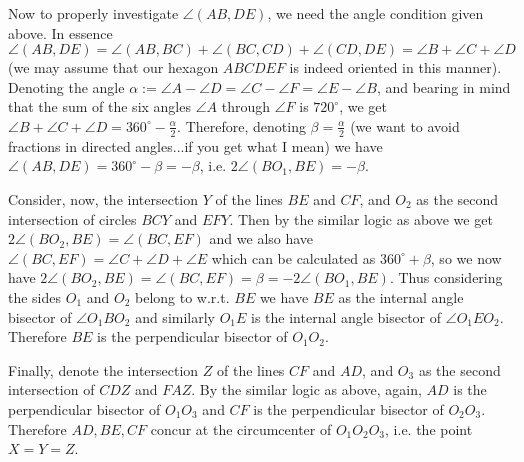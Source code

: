 \documentclass[11pt,a4paper]{article}
\begin{document}
\begin{enumerate}
	Now to properly investigate $\angle(AB, DE)$, we need the angle condition given above. In essence $\angle(AB, DE)=\angle(AB, BC)+\angle(BC, CD)+\angle(CD, DE)=\angle B+\angle C+\angle D$ (we may assume that our hexagon $ABCDEF$ is indeed oriented in this manner). Denoting the angle $\alpha := \angle A-\angle D = \angle C -\angle F = \angle E -\angle B$, and bearing in mind that the sum of the six angles $\angle A$ through $\angle F$ is $720^{\circ}$, we get $\angle B+\angle C+\angle D=360^{\circ}-\frac{\alpha}{2}$. Therefore, denoting $\beta=\frac{\alpha}{2}$ (we want to avoid fractions in directed angles...if you get what I mean) we have 
	$\angle(AB, DE)=360^{\circ}-\beta=-\beta$, i.e. $2\angle(BO_1, BE)=-\beta$. 
	
	Consider, now, the intersection $Y$ of the lines $BE$ and $CF$, and $O_2$ as the second intersection of circles $BCY$ and $EFY$. Then by the similar logic as above we get $2\angle (BO_2, BE)=\angle (BC, EF)$ and we also have $\angle (BC, EF)=\angle C+\angle D+\angle E$ which can be calculated as $360^{\circ}+\beta$, so we now have $2\angle (BO_2, BE)=\angle (BC, EF)=\beta=-2\angle (BO_1, BE)$. 
	Thus considering the sides $O_1$ and $O_2$ belong to w.r.t. $BE$ we have $BE$ as the internal angle bisector of $\angle O_1BO_2$ and similarly $O_1E$ is the internal angle bisector of $\angle O_1EO_2$. Therefore $BE$ is the perpendicular bisector of $O_1O_2$. 
	
	Finally, denote the intersection $Z$ of the lines $CF$ and $AD$, and $O_3$ as the second intersection of $CDZ$ and $FAZ$. By the similar logic as above, again, $AD$ is the perpendicular bisector of $O_1O_3$ and $CF$ is the perpendicular bisector of $O_2O_3$. Therefore $AD, BE, CF$ concur at the circumcenter of $O_1O_2O_3$, i.e. the point $X=Y=Z$. 
	
\end{enumerate}
\end{document}
